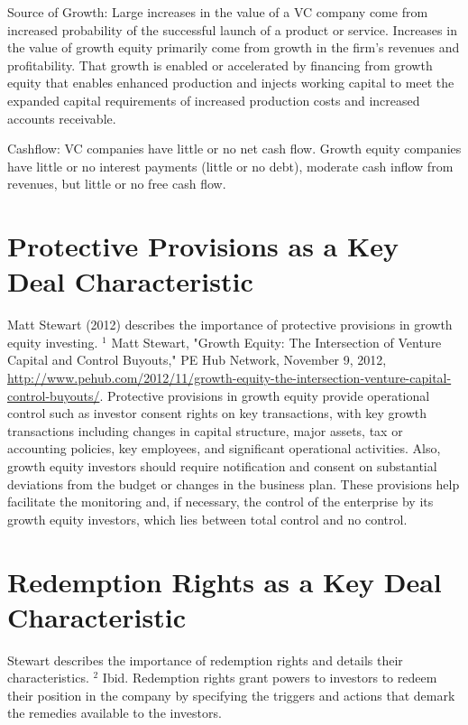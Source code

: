 \documentclass[11pt]{article}
\begin{document}
Source of Growth: Large increases in the value of a VC company come from increased probability of the successful launch of a product or service. Increases in the value of growth equity primarily come from growth in the firm's revenues and profitability. That growth is enabled or accelerated by financing from growth equity that enables enhanced production and injects working capital to meet the expanded capital requirements of increased production costs and increased accounts receivable.

Cashflow: VC companies have little or no net cash flow. Growth equity companies have little or no interest payments (little or no debt), moderate cash inflow from revenues, but little or no free cash flow.

\section*{Protective Provisions as a Key Deal Characteristic}
Matt Stewart (2012) describes the importance of protective provisions in growth equity investing. ${ }^{1}$ Matt Stewart, "Growth Equity: The Intersection of Venture Capital and Control Buyouts," PE Hub Network, November 9, 2012, \href{http://www.pehub.com/2012/11/growth-equity-the-intersection-venture-capital-control-buyouts/}{http://www.pehub.com/2012/11/growth-equity-the-intersection-venture-capital-control-buyouts/}. Protective provisions in growth equity provide operational control such as investor consent rights on key transactions, with key growth transactions including changes in capital structure, major assets, tax or accounting policies, key employees, and significant operational activities. Also, growth equity investors should require notification and consent on substantial deviations from the budget or changes in the business plan. These provisions help facilitate the monitoring and, if necessary, the control of the enterprise by its growth equity investors, which lies between total control and no control.

\section*{Redemption Rights as a Key Deal Characteristic}
Stewart describes the importance of redemption rights and details their characteristics. ${ }^{2}$ Ibid. Redemption rights grant powers to investors to redeem their position in the company by specifying the triggers and actions that demark the remedies available to the investors.
\end{document}
